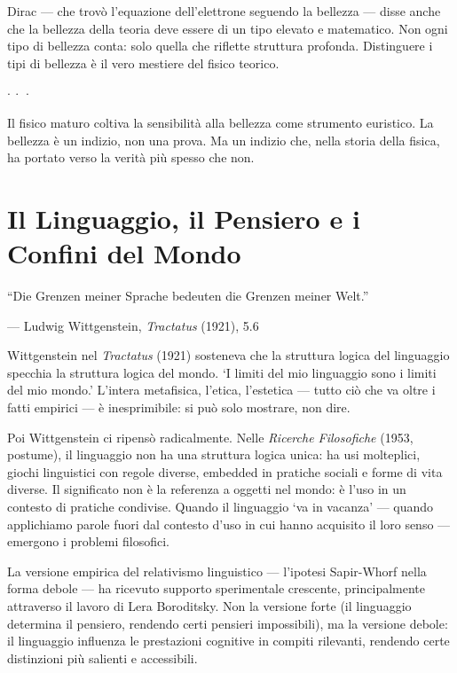 \documentclass[12pt,a4paper,openany]{book}
\newcommand{\sezione}[1]{\vspace{1.2em}{\large\bfseries #1}\vspace{0.5em}\par}
\newcommand{\puntini}{\begin{center}$\cdot\ \cdot\ \cdot$\end{center}\vspace{0.3em}}
\begin{document}
Dirac --- che trovò l'equazione dell'elettrone seguendo la bellezza --- disse anche che la bellezza della teoria deve essere di un tipo elevato e matematico. Non ogni tipo di bellezza conta: solo quella che riflette struttura profonda. Distinguere i tipi di bellezza è il vero mestiere del fisico teorico.

\puntini

Il fisico maturo coltiva la sensibilità alla bellezza come strumento euristico. La bellezza è un indizio, non una prova. Ma un indizio che, nella storia della fisica, ha portato verso la verità più spesso che non.

\chapter{Il Linguaggio, il Pensiero e i Confini del Mondo}

\epigraph{``Die Grenzen meiner Sprache bedeuten die Grenzen meiner Welt.''}{--- Ludwig Wittgenstein, \textit{Tractatus} (1921), 5.6}

\sezione{Wittgenstein I e Wittgenstein II}

Wittgenstein nel \textit{Tractatus} (1921) sosteneva che la struttura logica del linguaggio specchia la struttura logica del mondo. `I limiti del mio linguaggio sono i limiti del mio mondo.' L'intera metafisica, l'etica, l'estetica — tutto ciò che va oltre i fatti empirici — è inesprimibile: si può solo mostrare, non dire.

Poi Wittgenstein ci ripensò radicalmente. Nelle \textit{Ricerche Filosofiche} (1953, postume), il linguaggio non ha una struttura logica unica: ha usi molteplici, giochi linguistici con regole diverse, embedded in pratiche sociali e forme di vita diverse. Il significato non è la referenza a oggetti nel mondo: è l'uso in un contesto di pratiche condivise. Quando il linguaggio `va in vacanza' — quando applichiamo parole fuori dal contesto d'uso in cui hanno acquisito il loro senso — emergono i problemi filosofici.

\sezione{Il relativismo linguistico nella sua forma difendibile}

La versione empirica del relativismo linguistico — l'ipotesi Sapir-Whorf nella forma debole — ha ricevuto supporto sperimentale crescente, principalmente attraverso il lavoro di Lera Boroditsky. Non la versione forte (il linguaggio determina il pensiero, rendendo certi pensieri impossibili), ma la versione debole: il linguaggio influenza le prestazioni cognitive in compiti rilevanti, rendendo certe distinzioni più salienti e accessibili.
\end{document}
